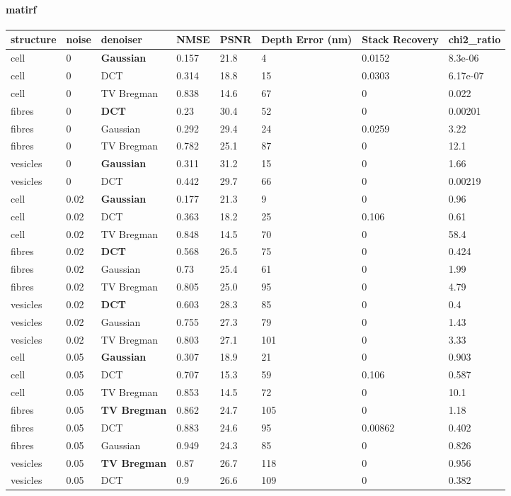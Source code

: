 \paragraph{matirf}
\begin{center}\begin{adjustbox}{max width=\linewidth}
\begin{tabular}{llllllll}
\toprule
structure & noise & denoiser & NMSE & PSNR & Depth Error (nm) & Stack Recovery & chi2\_ratio \\
\midrule
cell & 0 & \textbf{Gaussian} & 0.157 & 21.8 & 4 & 0.0152 & 8.3e-06 \\
cell & 0 & DCT & 0.314 & 18.8 & 15 & 0.0303 & 6.17e-07 \\
cell & 0 & TV Bregman & 0.838 & 14.6 & 67 & 0 & 0.022 \\
fibres & 0 & \textbf{DCT} & 0.23 & 30.4 & 52 & 0 & 0.00201 \\
fibres & 0 & Gaussian & 0.292 & 29.4 & 24 & 0.0259 & 3.22 \\
fibres & 0 & TV Bregman & 0.782 & 25.1 & 87 & 0 & 12.1 \\
vesicles & 0 & \textbf{Gaussian} & 0.311 & 31.2 & 15 & 0 & 1.66 \\
vesicles & 0 & DCT & 0.442 & 29.7 & 66 & 0 & 0.00219 \\
cell & 0.02 & \textbf{Gaussian} & 0.177 & 21.3 & 9 & 0 & 0.96 \\
cell & 0.02 & DCT & 0.363 & 18.2 & 25 & 0.106 & 0.61 \\
cell & 0.02 & TV Bregman & 0.848 & 14.5 & 70 & 0 & 58.4 \\
fibres & 0.02 & \textbf{DCT} & 0.568 & 26.5 & 75 & 0 & 0.424 \\
fibres & 0.02 & Gaussian & 0.73 & 25.4 & 61 & 0 & 1.99 \\
fibres & 0.02 & TV Bregman & 0.805 & 25.0 & 95 & 0 & 4.79 \\
vesicles & 0.02 & \textbf{DCT} & 0.603 & 28.3 & 85 & 0 & 0.4 \\
vesicles & 0.02 & Gaussian & 0.755 & 27.3 & 79 & 0 & 1.43 \\
vesicles & 0.02 & TV Bregman & 0.803 & 27.1 & 101 & 0 & 3.33 \\
cell & 0.05 & \textbf{Gaussian} & 0.307 & 18.9 & 21 & 0 & 0.903 \\
cell & 0.05 & DCT & 0.707 & 15.3 & 59 & 0.106 & 0.587 \\
cell & 0.05 & TV Bregman & 0.853 & 14.5 & 72 & 0 & 10.1 \\
fibres & 0.05 & \textbf{TV Bregman} & 0.862 & 24.7 & 105 & 0 & 1.18 \\
fibres & 0.05 & DCT & 0.883 & 24.6 & 95 & 0.00862 & 0.402 \\
fibres & 0.05 & Gaussian & 0.949 & 24.3 & 85 & 0 & 0.826 \\
vesicles & 0.05 & \textbf{TV Bregman} & 0.87 & 26.7 & 118 & 0 & 0.956 \\
vesicles & 0.05 & DCT & 0.9 & 26.6 & 109 & 0 & 0.382 \\
\bottomrule
\end{tabular}\end{adjustbox}\end{center}
